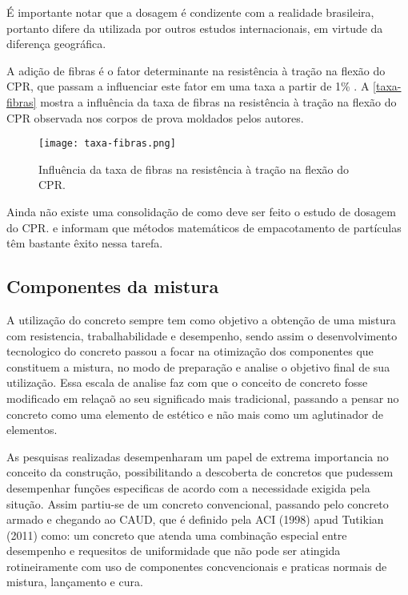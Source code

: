 É importante notar que a dosagem  é condizente com a realidade brasileira, portanto difere da utilizada por outros estudos internacionais, em virtude da diferença geográfica.

A adição de fibras é o fator determinante na resistência à tração na flexão do CPR, que passam a influenciar este fator em uma taxa a partir de 1\% \cite[p.~138]{Vanderlei_e_Giongo}. A \autoref{taxa-fibras} mostra a influência da taxa de fibras na resistência à tração na flexão do CPR observada nos corpos de prova moldados pelos autores.

\begin{figure}[htb]
	\caption{\label{taxa-fibras}Influência da taxa de fibras na resistência à tração na flexão do CPR.}
	\begin{center}
	    \texttt{[image: taxa-fibras.png]}
	\end{center}
\end{figure}

Ainda não existe uma consolidação de como deve ser feito o estudo de dosagem do CPR.  e  informam que métodos matemáticos de empacotamento de partículas têm bastante êxito nessa tarefa.

\subsection{Componentes da mistura}
A utilização do concreto sempre tem como objetivo a obtenção de uma mistura com resistencia, trabalhabilidade e desempenho, sendo assim o desenvolvimento tecnologico do concreto passou a focar na otimização dos componentes que constituem a mistura, no modo de preparação e analise o objetivo final de sua utilização. Essa escala de analise faz com que o conceito de concreto fosse modificado em relaçaõ ao seu significado mais tradicional, passando a pensar no concreto como uma elemento de estético e não mais como um aglutinador de elementos.

As pesquisas realizadas desempenharam um papel de extrema importancia no conceito da construção, possibilitando a descoberta de concretos que pudessem desempenhar funções especificas de acordo com a necessidade exigida pela situção. Assim partiu-se de um concreto convencional, passando pelo concreto armado e chegando ao CAUD, que é definido pela ACI (1998) apud Tutikian (2011) como: um concreto que atenda uma combinação especial entre desempenho e requesitos de uniformidade que não pode ser atingida rotineiramente com uso de componentes concvencionais e praticas normais de mistura, lançamento e cura.

